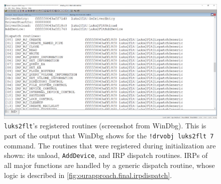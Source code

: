\begin{figure}[htb!]
	\center
	\includegraphics[scale=0.35]{../img/ourapproach.final.windbgdispatch.png}
	\caption[
		\texttt{luks2flt}'s registered routines
	]{
		\texttt{luks2flt}'s registered routines (screenshot from WinDbg). This is part of the output that WinDbg shows for the \texttt{!drvobj luks2flt 7} command. The routines that were registered during initialization are shown: its unload, \texttt{AddDevice}, and IRP dispatch routines. IRPs of all major functions are handled by a generic dispatch routine, whose logic is described in \autoref{fig:ourapproach.final.irpdispatch}.
	}
	\label{fig:ourapproach.final.windbgdispatch}
\end{figure}

